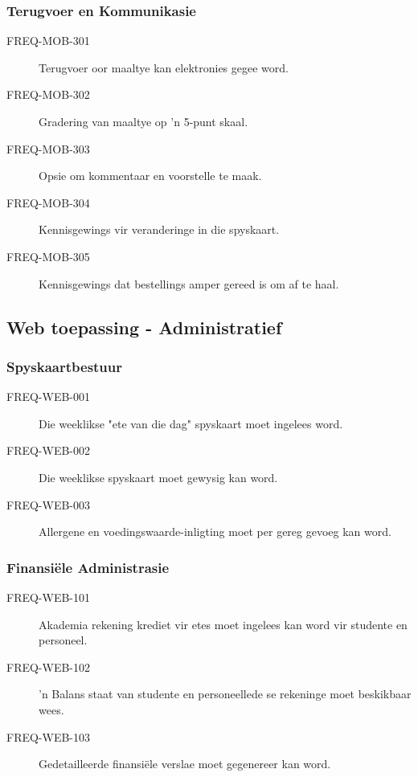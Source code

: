 \subsubsection{Terugvoer en Kommunikasie}
\begin{description}
  \item[FREQ-MOB-301] Terugvoer oor maaltye kan elektronies gegee word.
  \item[FREQ-MOB-302] Gradering van maaltye op 'n 5-punt skaal.
  \item[FREQ-MOB-303] Opsie om kommentaar en voorstelle te maak.
  \item[FREQ-MOB-304] Kennisgewings vir veranderinge in die spyskaart.
  \item[FREQ-MOB-305] Kennisgewings dat bestellings amper gereed is om af te haal.
\end{description}

\subsection{Web toepassing - Administratief}

\subsubsection{Spyskaartbestuur}
\begin{description}
  \item[FREQ-WEB-001] Die weeklikse "ete van die dag" spyskaart moet ingelees word.
  \item[FREQ-WEB-002] Die weeklikse spyskaart moet gewysig kan word.
  \item[FREQ-WEB-003] Allergene en voedingswaarde-inligting moet per gereg gevoeg kan word.
\end{description}

\subsubsection{Finansiële Administrasie}
\begin{description}  \item[FREQ-WEB-101] Akademia rekening krediet vir etes moet ingelees kan word vir studente en personeel.
  \item[FREQ-WEB-102] 'n Balans staat van studente en personeellede se rekeninge moet beskikbaar wees.
  \item[FREQ-WEB-103] Gedetailleerde finansiële verslae moet gegenereer kan word.
\end{description}

